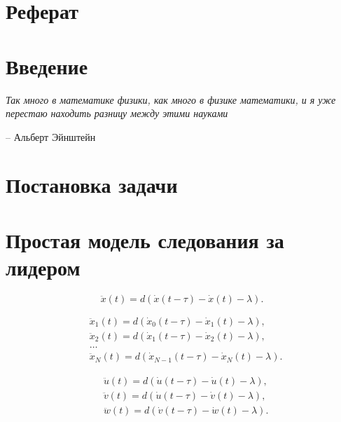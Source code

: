 \documentclass[12pt, a4paper]{extarticle}
\numberwithin{equation}{section}
\begin{document}
\justify 
\setlength{\parindent}{1.25cm} 
\newpage 
\thispagestyle{empty} 
\setcounter{page}{2} 
\section*{Реферат}
\vspace{\baselineskip}	

\newpage

\setcounter{page}{2}

\tableofcontents 
\newpage 

\section*{Введение}
\epigraph{\textit{Так много в математике физики, как много в физике математики, и я уже перестаю находить разницу между этими науками}}
{-- Альберт Эйнштейн}

\newpage

\section{Постановка задачи} 
  

\newpage

\section{Простая модель следования за лидером}

\begin{equation*}
\ddot{x}(t) = d (\dot{x}(t-\tau)-\dot{x}(t) - \lambda).
\end{equation*}

\begin{equation*}
\begin{split}
&\ddot{x}_1(t) = d (\dot{x}_0(t-\tau)-\dot{x}_1(t) - \lambda), \\ 
&\ddot{x}_2(t) = d (\dot{x}_1(t-\tau)-\dot{x}_2(t) - \lambda), \\
&\ldots \\
&\ddot{x}_N(t) = d (\dot{x}_{N-1}(t-\tau)-\dot{x}_N(t) - \lambda).
\end{split}
\end{equation*}

\begin{equation*}
\begin{split}
&\ddot{u}(t) = d (\dot{u}(t-\tau)-\dot{u}(t) - \lambda), \\ 
&\ddot{v}(t) = d (\dot{u}(t-\tau)-\dot{v}(t) - \lambda), \\
&\ddot{w}(t) = d (\dot{v}(t-\tau)-\dot{w}(t) - \lambda).
\end{split}
\end{equation*}
\end{document}
